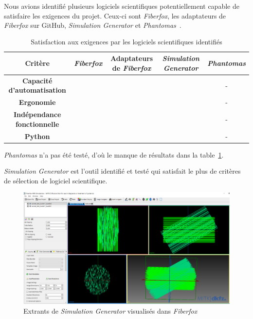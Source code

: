 \documentclass{article}
\newcommand{\cmark}{\ding{51}}
\newcommand{\xmark}{\ding{55}}
\begin{document}
  Nous avions identifié plusieurs logiciels scientifiques potentiellement capable de satisfaire les exigences du projet.
  Ceux-ci sont \textit{Fiberfox}, les adaptateurs de \textit{Fiberfox} sur GitHub, \textit{Simulation Generator} et \textit{Phantomas}~\citep{caruyer2014phantomas}.

  \begin{table}[H]

    \caption{Satisfaction aux exigences par les logiciels scientifiques identifiés}
    \centering

    \begin{tabular}{ |c| c c c c | }
      \toprule

      Critère
      & \textit{Fiberfox}
      & Adaptateurs de \textit{Fiberfox}
      & \textit{Simulation Generator}
      & \textit{Phantomas} \\

      \midrule

      \textbf{Capacité d'automatisation}  & \xmark & \cmark & \cmark & - \\
      \textbf{Ergonomie}                  & \xmark & \xmark & \cmark & - \\
      \textbf{Indépendance fonctionnelle} & \xmark & \xmark & \cmark & - \\
      \textbf{Python}                     & \xmark & \cmark & \cmark & - \\

      \bottomrule
    \end{tabular}
    \label{tab:tab1}

  \end{table}

  \textit{Phantomas} n'a pas été testé, d'où le manque de résultats dans la table~\ref{tab:tab1}.

  \textit{Simulation Generator} est l'outil identifié et testé qui satisfait le plus de critères de sélection de logiciel scientifique.

  \begin{figure}[H]
    \centering
    \includegraphics[width=\textwidth]{simulation_generator_results}
    \caption{Extrants de \textit{Simulation Generator} visualisés dans \textit{Fiberfox}}
    \label{fig:fig1}
  \end{figure}
\end{document}
